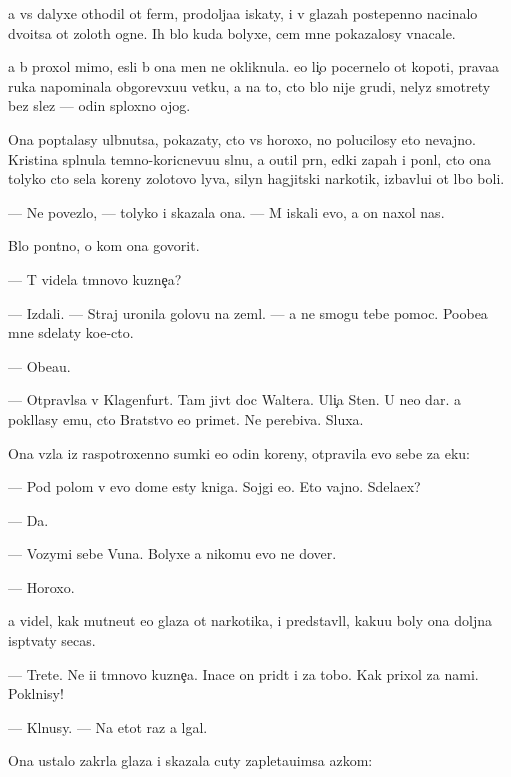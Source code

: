 \documentclass[10pt]{book}
\begin{document}
{\Y}a vs{\e} dalyxe othodil ot ferm{\yi}, prodolja{\y}a iskaty, i v glazah postepenno nacinalo dvo{\y}itsa ot zolot{\yi}h ogne{\y}. Ih b{\yi}lo kuda bolyxe, cem mne pokazalosy vnacale.

{\Y}a b{\yi} proxol mimo, {\y}esli b{\yi} ona men{\ia} ne okliknula. {\y}e{\y}o li{\c}o pocernelo ot kopoti, prava{\y}a ruka napominala obgorevxu{\y}u vetku, a na to, cto b{\yi}lo nije grudi, nelyz{\ia} smotrety bez slez — odin sploxno{\y} ojog.

Ona pop{\yi}talasy ul{\yi}bnutsa, pokazaty, cto vs{\e} horoxo, no polucilosy eto nevajno. Kristina spl{\iu}nula temno-koricnevu{\y}u sl{\iu}nu, {\y}a o{\x}util pr{\ia}n{\yi}{\y}, {\y}edki{\y} zapah i pon{\ia}l, cto ona tolyko cto s{\y}ela koreny zolotovo lyva, silyn{\yi}{\y} hagjitski{\y} narkotik, izbavl{\ia}{\y}u{\x}i{\y} ot l{\iu}bo{\y} boli.

— Ne povezlo, — tolyko i skazala ona. — M{\yi} iskali {\y}evo, a on naxol nas.

B{\yi}lo pon{\ia}tno, o kom ona govorit.

— T{\yi} videla t{\e}mnovo kuzne{\c}a?

— Izdali. — Straj uronila golovu na zeml{\iu}. — {\Y}a ne smogu tebe pomoc. Poobe{\x}a{\y} mne sdelaty ko{\y}e-cto.

— Obe{\x}a{\y}u.

— Otpravl{\ia}{\y}sa v Klagenfurt. Tam jiv{\e}t doc Waltera. Uli{\c}a Sten{\yi}. U ne{\y}o dar. {\Y}a pokl{\ia}lasy {\y}emu, cto Bratstvo {\y}e{\y}o primet. Ne perebiva{\y}. Sluxa{\y}.

Ona vz{\ia}la iz raspotroxenno{\y} sumki {\y}e{\x}o odin koreny, otpravila {\y}evo sebe za {\x}eku:

— Pod polom v {\y}evo dome {\y}esty kniga. Sojgi {\y}e{\y}o. Eto vajno. Sdela{\y}ex?

— Da.

— Vozymi sebe V{\y}una. Bolyxe {\y}a nikomu {\y}evo ne dover{\iu}.

— Horoxo.

{\Y}a videl, kak mutne{\y}ut {\y}e{\y}o glaza ot narkotika, i predstavl{\ia}l, kaku{\y}u boly ona doljna isp{\yi}t{\yi}vaty se{\y}cas.

— Tret{\y}e. Ne i{\x}i t{\e}mnovo kuzne{\c}a. Inace on prid{\e}t i za tobo{\y}. Kak prixol za nami. Pokl{\ia}nisy!

— Kl{\ia}nusy. — Na etot raz {\y}a lgal.

Ona ustalo zakr{\yi}la glaza i skazala cuty zapleta{\y}u{\x}imsa {\y}az{\yi}kom:
\end{document}
